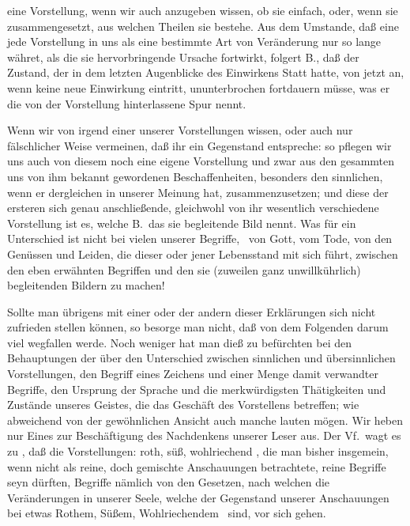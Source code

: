 eine Vorstellung, wenn wir auch anzugeben wissen, ob sie einfach, oder, wenn sie zusammengesetzt, aus welchen Theilen sie bestehe. Aus dem Umstande, daß eine jede Vorstellung in uns als eine bestimmte Art von Veränderung nur so lange währet, als die sie hervorbringende Ursache fortwirkt, folgert B., daß der Zustand, der in dem letzten Augenblicke des Einwirkens Statt hatte, von jetzt an, wenn keine neue Einwirkung eintritt, ununterbrochen fortdauern müsse, was er die von der Vorstellung hinterlassene Spur nennt. \par 
Wenn wir von irgend einer unserer Vorstellungen wissen, oder auch nur fälschlicher Weise vermeinen, daß ihr ein Gegenstand entspreche: so pflegen wir uns auch von diesem noch eine eigene Vorstellung und zwar aus den gesammten uns von  ihm bekannt gewordenen Beschaffenheiten, besonders den sinnlichen, wenn er dergleichen in unserer Meinung hat, zusammenzusetzen; und diese der ersteren sich genau anschließende, gleichwohl von ihr wesentlich verschiedene Vorstellung ist es, welche B.\ das sie begleitende Bild nennt. Was für ein Unterschied ist nicht bei vielen unserer Begriffe, \zB\ von Gott, vom Tode, von den Genüssen und Leiden, die dieser oder jener Lebensstand mit sich führt, zwischen den eben erwähnten Begriffen und den sie (zuweilen ganz unwillkührlich) begleitenden Bildern zu machen! \par 
Sollte man übrigens mit einer oder der andern dieser Erklärungen sich nicht zufrieden stellen können, so besorge man nicht, daß von dem Folgenden darum viel wegfallen werde. Noch weniger hat man dieß zu befürchten bei den Behauptungen der    über den Unterschied zwischen sinnlichen und übersinnlichen Vorstellungen, den Begriff eines Zeichens und einer Menge damit verwandter Begriffe, den Ursprung der Sprache und die merkwürdigsten Thätigkeiten und Zustände unseres Geistes, die das Geschäft des Vorstellens betreffen; wie abweichend von der gewöhnlichen Ansicht auch manche lauten mögen. Wir heben nur Eines zur Beschäftigung des Nachdenkens unserer Leser aus. Der Vf.\ wagt es zu , daß die Vorstellungen: roth, süß, wohlriechend \usw , die man bisher insgemein, wenn nicht als reine, doch gemischte Anschauungen betrachtete, reine Begriffe seyn dürften, Begriffe nämlich von den Gesetzen, nach welchen die Veränderungen in unserer Seele, welche der Gegenstand unserer Anschauungen bei etwas Rothem, Süßem, Wohlriechendem \usw\ sind, vor sich gehen. \par 
